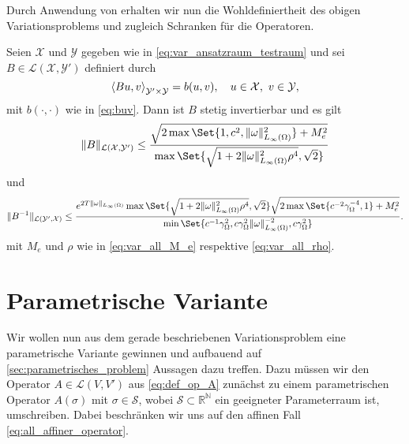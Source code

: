 Durch Anwendung von  erhalten wir nun die Wohldefiniertheit des obigen Variationsproblems und zugleich Schranken für die Operatoren.

\begin{Lemma}
    Seien $\mathcal X$ und $\mathcal Y$ gegeben wie in \eqref{eq:var_ansatzraum_testraum} und sei $B \in \mathcal L (\mathcal X, \mathcal Y')$ definiert durch
    \begin{equation}
        \left\langle Bu,v\right\rangle_{\mathcal Y' \times \mathcal Y}  = b(u, v), \quad u \in \mathcal X,~ v \in \mathcal Y,
    \end{equation}
    mit $b(\cdot, \cdot)$ wie in \eqref{eq:buv}.
    Dann ist $B$ stetig invertierbar und es gilt
    \begin{equation}
        \norm{B}_{\mathcal L(\mathcal X, \mathcal Y')}
        \leq
        \frac{\sqrt{2 \max\Set{1, c^{2}, \norm{\omega}_{L_{\infty}(\Omega)}^{2}} + M_{e}^{2}}}{\max\Set{\sqrt{1 + 2 \norm{\omega}_{L_{\infty}(\Omega)}^{2} \rho^{4}}, \sqrt{2} }}
    \end{equation}
    und
    \begin{equation}
        \norm{B^{-1}}_{\mathcal L( \mathcal Y', \mathcal X)}
        \leq \frac{e^{2 T \norm{\omega}_{L_{\infty}(\Omega)}} \max\Set{\sqrt{1 + 2 \norm{\omega}_{L_{\infty}(\Omega)}^{2} \rho^{4}}, \sqrt{2}} \sqrt{2 \max\Set{c^{-2} \gamma_{\Omega}^{-4}, 1} + M_{e}^{2}}}{\min\Set{c^{-1} \gamma_{\Omega}^{2}, c \gamma_{\Omega}^{2} \norm{\omega}_{L_{\infty}(\Omega)}^{-2}, c \gamma_{\Omega}^{2} }}.
    \end{equation}
    mit $M_{e}$ und $\rho$ wie in \eqref{eq:var_all_M_e} respektive \eqref{eq:var_all_rho}.
\end{Lemma}

\section{Parametrische Variante} %
\label{sec:parametrische_variante}

Wir wollen nun aus dem gerade beschriebenen Variationsproblem eine parametrische Variante gewinnen und aufbauend auf \autoref{sec:parametrisches_problem} Aussagen dazu treffen.
Dazu müssen wir den Operator $A \in \mathcal L(V, V')$ aus \eqref{eq:def_op_A} zunächst zu einem parametrischen Operator $A(\sigma)$ mit $\sigma \in \mathcal S$, wobei $\mathcal S \subset \mathbb{R}^{\mathbb{N}}$ ein geeigneter Parameterraum ist, umschreiben.
Dabei beschränken wir uns auf den affinen Fall \eqref{eq:all_affiner_operator}.

